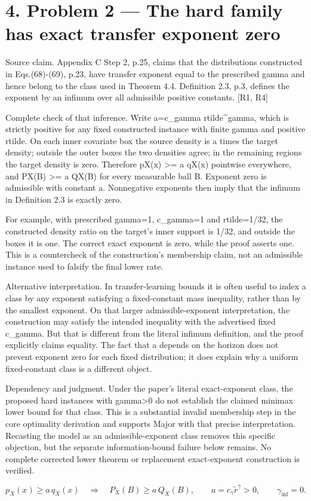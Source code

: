\documentclass[10pt]{article}
\begin{document}
\section*{4. Problem 2 — The hard family has exact transfer exponent zero}
Source claim. Appendix C Step 2, p.25, claims that the distributions constructed in Eqs.(68)-(69), p.23, have transfer exponent equal to the prescribed gamma and hence belong to the class used in Theorem 4.4. Definition 2.3, p.3, defines the exponent by an infimum over all admissible positive constants. [R1, R4]\par
Complete check of that inference. Write a=c\_gamma rtilde\textasciicircum{}gamma, which is strictly positive for any fixed constructed instance with finite gamma and positive rtilde. On each inner covariate box the source density is a times the target density; outside the outer boxes the two densities agree; in the remaining regions the target density is zero. Therefore pX(x) >= a qX(x) pointwise everywhere, and PX(B) >= a QX(B) for every measurable ball B. Exponent zero is admissible with constant a. Nonnegative exponents then imply that the infimum in Definition 2.3 is exactly zero.\par
For example, with prescribed gamma=1, c\_gamma=1 and rtilde=1/32, the constructed density ratio on the target’s inner support is 1/32, and outside the boxes it is one. The correct exact exponent is zero, while the proof asserts one. This is a countercheck of the construction’s membership claim, not an admissible instance used to falsify the final lower rate.\par
Alternative interpretation. In transfer-learning bounds it is often useful to index a class by any exponent satisfying a fixed-constant mass inequality, rather than by the smallest exponent. On that larger admissible-exponent interpretation, the construction may satisfy the intended inequality with the advertised fixed c\_gamma. But that is different from the literal infimum definition, and the proof explicitly claims equality. The fact that a depends on the horizon does not prevent exponent zero for each fixed distribution; it does explain why a uniform fixed-constant class is a different object.\par
Dependency and judgment. Under the paper’s literal exact-exponent class, the proposed hard instances with gamma>0 do not establish the claimed minimax lower bound for that class. This is a substantial invalid membership step in the core optimality derivation and supports Major with that precise interpretation. Recasting the model as an admissible-exponent class removes this specific objection, but the separate information-bound failure below remains. No complete corrected lower theorem or replacement exact-exponent construction is verified.\par
\[p_X(x)\ge a\,q_X(x)\quad\Longrightarrow\quad P_X(B)\ge a\,Q_X(B),\qquad a=c_\gamma\widetilde r^\gamma>0,\qquad \gamma_{\inf}=0.\]\par
\end{document}
